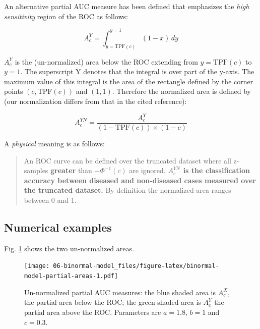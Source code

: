 \documentclass[
]{book}
\begin{document}
An alternative partial AUC measure has been defined \citep{jiang1996receiver} that emphasizes the \emph{high sensitivity} region of the ROC as follows:

\begin{equation} 
A_c^{Y} = \int_{y=\text{TPF}(c)}^{y=1} \left (1-x  \right ) \, dy
\label{eq:binormal-model-partial-area-ac-metz}
\end{equation}

\(A_c^{Y}\) is the (un-normalized) area below the ROC extending from \(y = \text{TPF}(c)\) to \(y = 1\). The superscript Y denotes that the integral is over part of the y-axis. The maximum value of this integral is the area of the rectangle defined by the corner points \((c,\text{TPF}(c))\) and \((1,1)\). Therefore the normalized area is defined by (our normalization differs from that in the cited reference):

\begin{equation}
A_c^{YN} = \frac{A_c^{Y}}{\left (1 - \text{TPF}(c)  \right ) \times \left (1-c  \right )}
\label{eq:binormal-model-normalized-partial-auc-sensitivity}
\end{equation}

A \emph{physical} meaning is as follows:

\begin{quote}
An ROC curve can be defined over the truncated dataset where all z-samples \textbf{greater} than \(-\Phi^{-1}(c)\) are ignored. \textbf{\(A_c^{YN}\) is the classification accuracy between diseased and non-diseased cases measured over the truncated dataset.} By definition the normalized area ranges between 0 and 1.
\end{quote}

\hypertarget{binormal-model-metz-partial-auc-example}{%
\subsection{Numerical examples}\label{binormal-model-metz-partial-auc-example}}

Fig. \ref{fig:binormal-model-partial-areas} shows the two un-normalized areas.

\begin{figure}
\centering
\texttt{[image: 06-binormal-model\_files/figure-latex/binormal-model-partial-areas-1.pdf]}
\caption{\label{fig:binormal-model-partial-areas}Un-normalized partial AUC measures: the blue shaded area is \(A_c^{X}\), the partial area below the ROC; the green shaded area is \(A_c^{Y}\) the partial area above the ROC. Parameters are \(a = 1.8\), \(b = 1\) and \(c = 0.3\).}
\end{figure}
\end{document}
